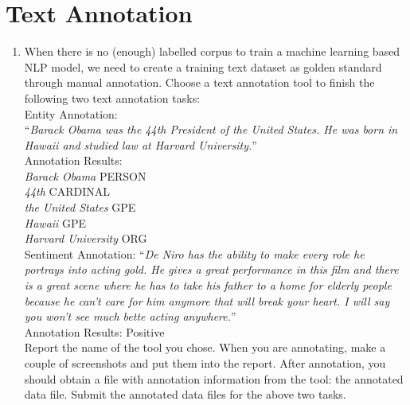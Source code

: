 \documentclass[conference]{IEEEtran}
\begin{document}
\section{Text Annotation}
\begin{enumerate}
\item When there is no (enough) labelled corpus to train a machine learning based NLP model, we need to create a training text dataset as golden standard through manual annotation. Choose a text annotation tool to finish the following two text annotation tasks:\\

\noindent Entity Annotation:\\ “\textit{Barack Obama was the 44th President of the United States. He was born in Hawaii and studied law at Harvard University.}”\\

Annotation Results: \\
\textit{Barack Obama} PERSON\\
\textit{44th} CARDINAL\\
\textit{the United States} GPE\\
\textit{Hawaii} GPE\\
\textit{Harvard University} ORG\\

Sentiment Annotation: “\textit{De Niro has the ability to make every role he portrays into acting gold. He gives a great performance in this film and there is a great scene where he has to take his father to a home for elderly people because he can't care for him anymore that will break your heart. I will say you won't see much bette acting anywhere.}”\\
Annotation Results: Positive\\

Report the name of the tool you chose. When you are annotating, make a couple of screenshots and put them into the report. After annotation, you should obtain a file with annotation information from the tool: the annotated data file. Submit the annotated data files for the above two tasks.\\


\end{enumerate}
\end{document}
